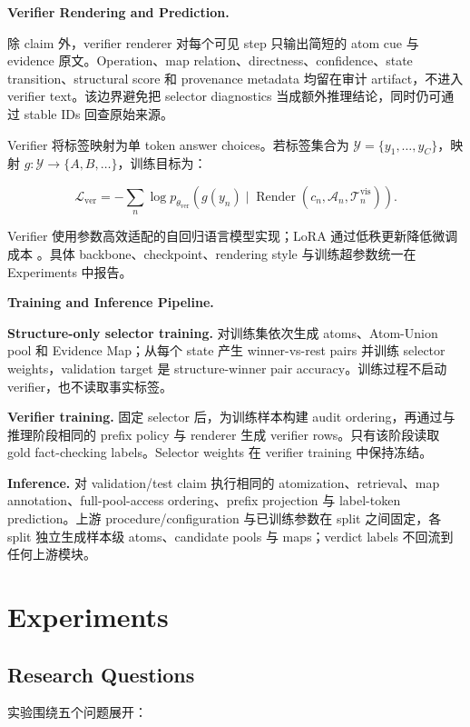 \documentclass[letterpaper]{article}
\begin{document}
\textbf{Verifier Rendering and Prediction.}

除 claim 外，verifier renderer 对每个可见 step 只输出简短的 atom cue 与 evidence 原文。Operation、map relation、directness、confidence、state transition、structural score 和 provenance metadata 均留在审计 artifact，不进入 verifier text。该边界避免把 selector diagnostics 当成额外推理结论，同时仍可通过 stable IDs 回查原始来源。

Verifier 将标签映射为单 token answer choices。若标签集合为 $\mathcal Y=\{y_1,\ldots,y_C\}$，映射 $g:\mathcal Y\rightarrow\{A,B,\ldots\}$，训练目标为：

\[
\mathcal L_{\mathrm{ver}}=-\sum_n
\log p_{\theta_{\mathrm{ver}}}\left(g(y_n)\mid
\operatorname{Render}(c_n,\mathcal A_n,\mathcal T_n^{\mathrm{vis}})\right).
\]

Verifier 使用参数高效适配的自回归语言模型实现；LoRA 通过低秩更新降低微调成本 \citep{Hu2022LoRA}。具体 backbone、checkpoint、rendering style 与训练超参数统一在 Experiments 中报告。

\textbf{Training and Inference Pipeline.}

\textbf{Structure-only selector training.} 对训练集依次生成 atoms、Atom-Union pool 和 Evidence Map；从每个 state 产生 winner-vs-rest pairs 并训练 selector weights，validation target 是 structure-winner pair accuracy。训练过程不启动 verifier，也不读取事实标签。

\textbf{Verifier training.} 固定 selector 后，为训练样本构建 audit ordering，再通过与推理阶段相同的 prefix policy 与 renderer 生成 verifier rows。只有该阶段读取 gold fact-checking labels。Selector weights 在 verifier training 中保持冻结。

\textbf{Inference.} 对 validation/test claim 执行相同的 atomization、retrieval、map annotation、full-pool-access ordering、prefix projection 与 label-token prediction。上游 procedure/configuration 与已训练参数在 split 之间固定，各 split 独立生成样本级 atoms、candidate pools 与 maps；verdict labels 不回流到任何上游模块。

\section{Experiments}

\subsection{Research Questions}

实验围绕五个问题展开：
\end{document}
